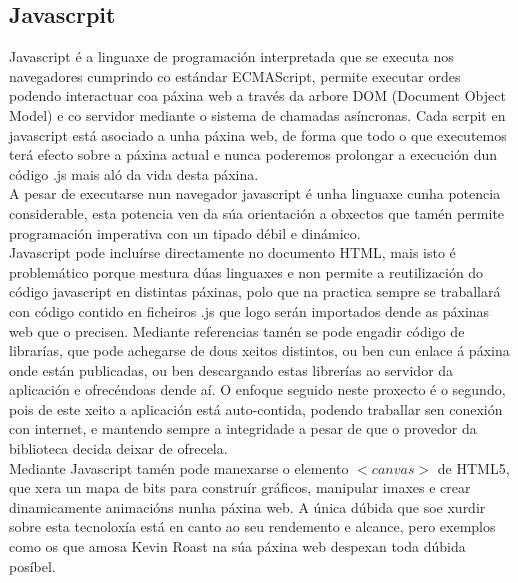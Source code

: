     \subsection{Javascrpit}
        Javascript é a linguaxe de programación interpretada que se executa nos navegadores
        cumprindo co estándar ECMAScript, permite executar ordes podendo interactuar coa páxina 
        web a través da arbore DOM (Document Object Model) e co servidor mediante o sistema de
        chamadas asíncronas. Cada scrpit en javascript está asociado a unha páxina web, de forma
        que todo o que executemos terá efecto sobre a páxina actual e nunca poderemos prolongar
        a execución dun código .js mais aló da vida desta páxina.\\
        
        A pesar de executarse nun navegador javascript é unha linguaxe cunha potencia 
        considerable, esta potencia ven da súa orientación a obxectos que tamén permite 
        programación imperativa con un tipado débil e dinámico.\\
        
        Javascript pode incluírse directamente no documento HTML, mais isto é problemático 
        porque mestura dúas linguaxes e non permite a reutilización do código javascript en
        distintas páxinas, polo que na practica sempre se traballará con código contido en
        ficheiros .js que logo serán importados dende as páxinas web que o precisen. Mediante 
        referencias tamén se pode engadir código de librarías, que pode achegarse de dous xeitos
        distintos, ou ben cun enlace á páxina onde están publicadas, ou ben descargando estas
        librerías ao servidor da aplicación e ofrecéndoas dende aí. O enfoque seguido neste 
        proxecto é o segundo, pois de este xeito a aplicación está auto-contida, podendo traballar
        sen conexión con internet, e mantendo sempre a integridade a pesar de que o provedor
        da biblioteca decida deixar de ofrecela.\\
        
        Mediante Javascript tamén pode manexarse o elemento $<canvas>$ de HTML5, que xera un mapa
        de bits para construír gráficos, manipular imaxes e crear dinamicamente animacións nunha
        páxina web. A única dúbida que soe xurdir sobre esta tecnoloxía está en canto ao seu 
        rendemento e alcance, pero exemplos como os que amosa Kevin Roast na súa páxina 
        web\cite{kevin-roast-canvas-examples} despexan toda dúbida posíbel.\\
        
